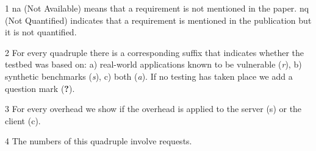 \documentclass[conference]{IEEEtran}
\begin{document}
\begin{landscape}
\begin{table}
\begin{threeparttable}
\begin{small}
\begin{tablenotes}
\begin{footnotesize}
       	\item[1] {\sc na} (Not Available) means that a requirement is not mentioned in the paper.
	{\sc nq} (Not Quantified) indicates that a requirement is mentioned in the publication
	but it is not quantified.
		\item[2] For every quadruple there is a corresponding suffix that indicates whether the testbed was
	based on: a) real-world applications known to be vulnerable ({\it r}), b) synthetic benchmarks ({\it s}), c) both ({\it a}).
	If no testing has taken place we add a question mark ({\bf ?}).
    \item[3] For every overhead we show if the overhead is applied to the server ({\sc s}) or the client ({\sc c}). 
    \item[4] The numbers of this quadruple involve requests.
	\end{footnotesize}
    \end{tablenotes}
    \end{small}
    \end{threeparttable}
\end{table}
\end{landscape}
\end{document}
